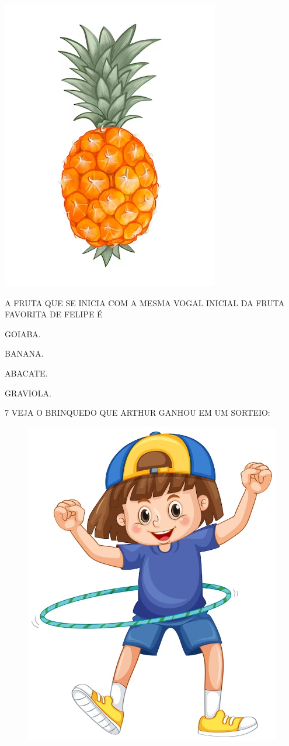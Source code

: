 \begin{minipage}{.5\textwidth}
\includegraphics[width=.8\textwidth]{./media/image215.png}
\end{minipage}
\hspace{.5cm}
\begin{minipage}{.5\textwidth}
A FRUTA QUE SE INICIA COM A MESMA VOGAL INICIAL DA FRUTA FAVORITA DE FELIPE É

\begin{escolha}

\item GOIABA.

\item BANANA.

\item ABACATE.

\item GRAVIOLA.

\end{escolha}
\end{minipage}

\num{7} VEJA O BRINQUEDO QUE ARTHUR GANHOU EM UM SORTEIO:

\begin{figure}[H]
\centering
\includegraphics[width=.4\textwidth]{./media/image216.png}
\end{figure}

